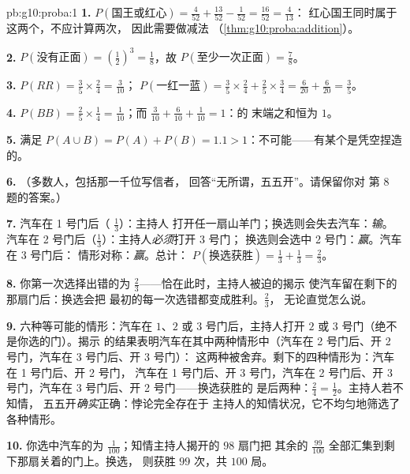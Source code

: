 \begin{solution}{pb:g10:proba:1}
\textbf{1.} $P(\text{国王或红心}) = \frac{4}{52} +
\frac{13}{52} - \frac{1}{52} = \frac{16}{52} = \frac{4}{13}$：
红心国王同时属于这两个，不应计算两次，
因此需要做减法
（\cref{thm:g10:proba:addition}）。

\textbf{2.} $P(\text{没有正面}) = \left(\frac12\right)^3 =
\frac18$，故 $P(\text{至少一次正面}) = \frac78$。

\textbf{3.} $P(RR) = \frac35 \times \frac24 = \frac{3}{10}$；
$P(\text{一红一蓝}) = \frac35 \times \frac24 + \frac25
\times \frac34 = \frac{6}{20} + \frac{6}{20} = \frac35$。

\textbf{4.} $P(BB) = \frac25 \times \frac14 = \frac1{10}$；而
$\frac{3}{10} + \frac{6}{10} + \frac{1}{10} = 1$：的
末端之和恒为 $1$。

\textbf{5.} 满足 $P(A \cup B) = P(A) +
P(B) = 1.1 > 1$：不可能——有某个是凭空捏造的。

\textbf{6.} （多数人，包括那一千位写信者，
回答“无所谓，五五开”。请保留你对
第 8 题的答案。）

\textbf{7.} 汽车在 1 号门后（ $\frac13$）：主持人
打开任一扇山羊门；换选则会失去汽车：\emph{输}。
汽车在 2 号门后（$\frac13$）：主持人\emph{必须}打开 3 号门；
换选则会选中 2 号门：\emph{赢}。汽车在 3 号门后：
情形对称：\emph{赢}。总计：
$P(\text{换选获胜}) = \frac13 + \frac13 = \frac23$。

\textbf{8.} 你第一次选择出错的为
$\frac23$——恰在此时，主持人被迫的揭示
使汽车留在剩下的那扇门后：换选会把
最初的每一次选错都变成胜利。$\frac23$，
无论直觉怎么说。

\textbf{9.} 六种等可能的情形：汽车在 $1$、$2$
或 $3$ 号门后，主持人打开 $2$ 或 $3$ 号门（绝不是你选的门）。揭示
的结果表明汽车在其中两种情形中（汽车在 2 号门后、开 2 号门，汽车在 3 号门后、开 3 号门）：
这两种被舍弃。剩下的四种情形为：汽车在 1 号门后、开 2 号门，
汽车在 1 号门后、开 3 号门，汽车在 2 号门后、开 3 号门，汽车在 3 号门后、开 2 号门——换选获胜的
是后两种：$\frac24 = \frac12$。主持人若不知情，
五五开\emph{确实}正确：悖论完全存在于
主持人的知情状况，它不均匀地筛选了各种情形。

\textbf{10.} 你选中汽车的为
$\frac{1}{100}$；知情主持人揭开的 $98$ 扇门把
其余的 $\frac{99}{100}$ 全部汇集到剩下那扇关着的门上。换选，
则获胜 $99$ 次，共 $100$ 局。


\end{solution}
